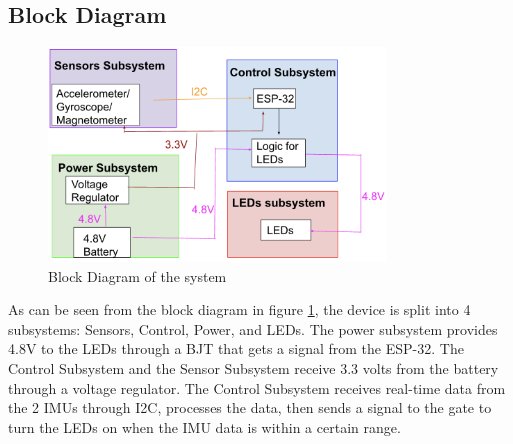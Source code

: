 \subsection{Block Diagram}
\begin{figure}[ht]
    \centering
    \includegraphics[width=0.8\textwidth]{images/block_diagram_new.png}
    \caption{Block Diagram of the system}
    \label{fig:block_diagram}
\end{figure}
As can be seen from the block diagram in figure \ref{fig:block_diagram}, the device is split into 4 subsystems: Sensors, Control, Power, and LEDs. The power subsystem provides 4.8V to the LEDs through a BJT that gets a signal from the ESP-32. The Control Subsystem and the Sensor Subsystem receive 3.3 volts from the battery through a voltage regulator. The Control Subsystem receives real-time data from the 2 IMUs through I2C, processes the data, then sends a signal to the gate to turn the LEDs on when the IMU data is within a certain range.


\newpage

